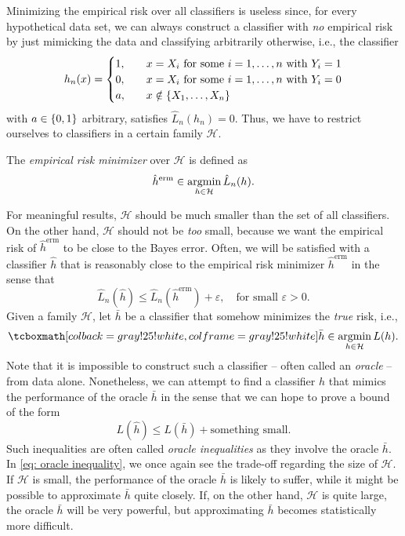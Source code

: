 Minimizing the empirical risk over all classifiers is useless since, for every hypothetical data set, we can always construct a classifier with \emph{no} empirical risk by just mimicking the data and classifying arbitrarily otherwise, i.e., the classifier
\[
    h_n(x) = \begin{cases}
        1, \quad & x = X_i \text{ for some } i = 1, \dots, n \text{ with } Y_i = 1 \\
        0, \quad & x = X_i \text{ for some } i = 1, \dots, n \text{ with } Y_i = 0 \\
        a, \quad & x \notin \set{X_1, \dots, X_n}
    \end{cases}
\]
with $a \in \set{0, 1}$ arbitrary, satisfies $\hat{L}_n(h_n) = 0$. Thus, we have to restrict ourselves to classifiers in a certain family $\mathcal{H}$.

\begin{definition}
The \emph{empirical risk minimizer} over $\mathcal{H}$ is defined as
\[
    \hat{h}^{\text{erm}} \in \operatorname*{argmin}_{h \in \mathcal{H}} \hat{L}_n(h).
\]
\end{definition}

For meaningful results, $\mathcal{H}$ should be much smaller than the set of all classifiers. On the other hand, $\mathcal{H}$ should not be \emph{too} small, because we want the empirical risk of $\hat{h}^{\text{erm}}$ to be close to the Bayes error. Often, we will be satisfied with a classifier $\hat{h}$ that is reasonably close to the empirical risk minimizer $\hat{h}^{\text{erm}}$ in the sense that
\[
    \hat{L}_n(\hat{h}) \leq \hat{L}_n(\hat{h}^{\text{erm}}) + \varepsilon, \quad \text{for small } \varepsilon > 0.
\]
Given a family $\mathcal{H}$, let $\bar{h}$ be a classifier that somehow minimizes the \emph{true} risk, i.e.,
\[
    \highlightMath{
        \bar{h} \in \argmin_{h\in \mathcal{H}} L(h).
    }
\]
Note that it is impossible to construct such a classifier -- often called an \emph{oracle} -- from data alone. Nonetheless, we can attempt to find a classifier $\hat{h}$ that mimics the performance of the oracle $\bar{h}$ in the sense that we can hope to prove a bound of the form
\begin{equation}
    \label{eq: oracle inequality}
    L(\hat{h}) \leq L(\bar{h}) + \text{something small}.
\end{equation}
Such inequalities are often called \emph{oracle inequalities} as they involve the oracle $\bar{h}$. In \eqref{eq: oracle inequality}, we once again see the trade-off regarding the size of $\mathcal{H}$. If $\mathcal{H}$ is small, the performance of the oracle $\bar{h}$ is likely to suffer, while it might be possible to approximate $\bar{h}$ quite closely. If, on the other hand, $\mathcal{H}$ is quite large, the oracle $\bar{h}$ will be very powerful, but approximating $\bar{h}$ becomes statistically more difficult.

